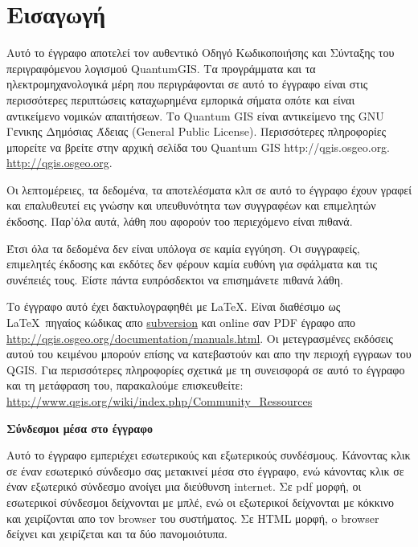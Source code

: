 
\thispagestyle{empty}


\section*{Εισαγωγή}


\vspace{1cm}

Αυτό το έγγραφο αποτελεί τον αυθεντικό Οδηγό Κωδικοποιήσης και Σύνταξης του περιγραφόμενου λογισμού QuantumGIS. Τα προγράμματα και τα ηλεκτρομηχανολογικά μέρη που περιγράφονται σε αυτό το έγγραφο είναι στις περισσότερες περιπτώσεις καταχωρημένα εμπορικά σήματα οπότε και είναι αντικείμενο νομικών απαιτήσεων. Το Quantum GIS είναι αντικείμενο της GNU Γενικης Δημόσιας Άδειας (General Public License). Περισσότερες πληροφορίες μπορείτε να βρείτε στην αρχική σελίδα του Quantum GIS http://qgis.osgeo.org.
\url{http://qgis.osgeo.org}.

Οι λεπτομέρειες, τα δεδομένα, τα αποτελέσματα κλπ σε αυτό το έγγραφο έχουν γραφεί και επαλυθευτεί εις γνώσην και υπευθυνότητα των συγγραφέων και επιμελητών έκδοσης. Παρ’όλα αυτά, λάθη που αφορούν τοο περιεχόμενο είναι πιθανά. 

Έτσι όλα τα δεδομένα δεν είναι υπόλογα σε καμία εγγύηση. Οι συγγραφείς, επιμελητές έκδοσης και εκδότες δεν φέρουν καμία ευθύνη για σφάλματα και τις συνέπειές τους. Είστε πάντα ευπρόσδεκτοι να επισημάνετε πιθανά λάθη.

Το έγγραφο αυτό έχει δακτυλογραφηθέι με \LaTeX. Είναι διαθέσιμο ως \LaTeX~πηγαίος κώδικας
απο \href{http://www.qgis.org/wiki/index.php/Manual_Writing}{subversion} 
και online σαν PDF έγραφο απο \url{http://qgis.osgeo.org/documentation/manuals.html}. 
Οι μετεγρασμένες εκδόσεις αυτού του κειμένου μπορούν επίσης να κατεβαστούν και απο την περιοχή εγγραων του QGIS. Για περισσότερες πληροφορίες σχετικά με τη συνεισφορά σε αυτό το έγγραφο και τη μετάφραση του, παρακαλούμε επισκευθείτε: 
\url{http://www.qgis.org/wiki/index.php/Community_Ressources} 

\vspace{0.5cm}

\textbf{Σύνδεσμοι μέσα στο έγγραφο}

Αυτό το έγγραφο εμπεριέχει εσωτερικούς και εξωτερικούς συνδέσμους. Κάνοντας κλικ σε έναν εσωτερικό σύνδεσμο σας μετακινεί μέσα στο έγγραφο, ενώ κάνοντας κλικ σε έναν εξωτερικό σύνδεσμο ανοίγει μια διεύθυνση internet. Σε pdf μορφή, οι εσωτερικοί σύνδεσμοι δείχνονται με μπλέ, ενώ οι εξωτερικοί δείχνονται με κόκκινο και χειρίζονται απο τον browser του συστήματος. Σε HTML μορφή, o browser δείχνει και χειρίζεται και τα δύο πανομοιότυπα. 


